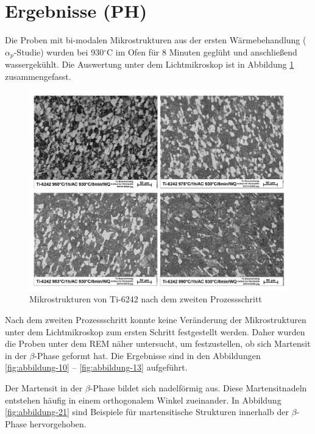 \section{Ergebnisse (PH)}

Die Proben mit bi-modalen Mikrostrukturen aus der ersten Wärmebehandlung ($\alpha_p$-Studie) wurden bei 930$^\circ$C im Ofen für 8 Minuten geglüht und anschließend wassergekühlt. Die Auswertung unter dem Lichtmikroskop ist in Abbildung \ref{fig:abbildung-9} zusammengefasst.

\begin{figure}[h]
	\centering
	\includegraphics[width=0.9\linewidth]{./Bilder/Abbildung 9.png}
	\caption[Abbildung 9]{Mikrostrukturen von Ti-6242 nach dem zweiten Prozessschritt}
	\label{fig:abbildung-9}
\end{figure}

Nach dem zweiten Prozessschritt konnte keine Veränderung der Mikrostrukturen unter dem Lichtmikroskop zum ersten Schritt festgestellt werden. Daher wurden die Proben unter dem REM näher untersucht, um festzustellen, ob sich Martensit in der $\beta$-Phase geformt hat. Die Ergebnisse sind in den Abbildungen \ref{fig:abbildung-10} -- \ref{fig:abbildung-13} aufgeführt. 

Der Martensit in der $\beta$-Phase bildet sich nadelförmig aus. Diese Martensitnadeln entstehen häufig in einem orthogonalem Winkel zueinander. In Abbildung \ref{fig:abbildung-21} sind Beispiele für martensitische Strukturen innerhalb der $\beta$-Phase hervorgehoben.

